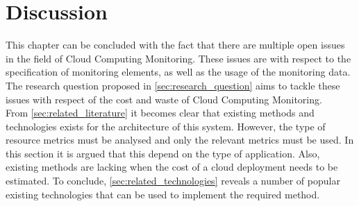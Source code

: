 \section{Discussion} \label{sec:relatedwork_discussion}

This chapter can be concluded with the fact that there are multiple open issues in the field of Cloud Computing Monitoring. These issues are with respect to the specification of monitoring elements, as well as the usage of the monitoring data. The research question proposed in \autoref{sec:research_question}
aims to tackle these issues with respect of the cost and waste of Cloud Computing Monitoring.\\

\noindent
From \autoref{sec:related_literature} it becomes clear that existing methods and technologies exists for the architecture of this system. However, the type of resource metrics must be analysed and only the relevant metrics must be used. In this section it is argued that this depend on the type of application. Also, existing methods are lacking when the cost of a cloud deployment needs to be estimated. To conclude, \autoref{sec:related_technologies} reveals a number of popular existing technologies that can be used to implement the required method.